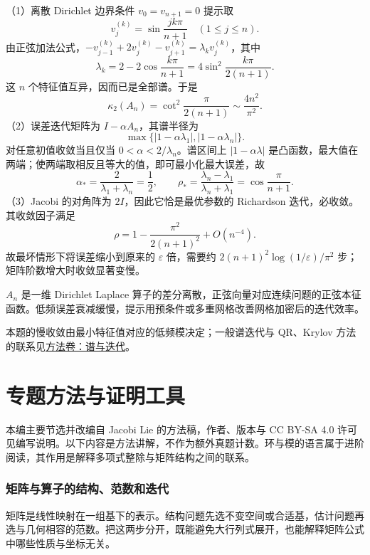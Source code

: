 \documentclass[12pt,fontset=fandol]{ctexart}
\begin{document}
\begin{solve}

（1）离散 Dirichlet 边界条件 $v_0=v_{n+1}=0$ 提示取
\[
v_j^{(k)}=\sin\frac{jk\pi}{n+1}\quad(1\le j\le n).
\]
由正弦加法公式，$-v_{j-1}^{(k)}+2v_j^{(k)}-v_{j+1}^{(k)}=\lambda_kv_j^{(k)}$，其中
\[
\lambda_k=2-2\cos\frac{k\pi}{n+1}=4\sin^2\frac{k\pi}{2(n+1)}.
\]
这 $n$ 个特征值互异，因而已是全部谱。于是
\[
\kappa_2(A_n)=\cot^2\frac\pi{2(n+1)}\sim\frac{4n^2}{\pi^2}.
\]
（2）误差迭代矩阵为 $I-\alpha A_n$，其谱半径为
\[
\max\{|1-\alpha\lambda_1|,|1-\alpha\lambda_n|\}.
\]
对任意初值收敛当且仅当 $\boxed{0<\alpha<2/\lambda_n}$。谱区间上 $|1-\alpha\lambda|$ 是凸函数，最大值在两端；使两端取相反且等大的值，即可最小化最大误差，故
\[
\boxed{\alpha_*=\frac2{\lambda_1+\lambda_n}=\frac12},\qquad
\rho_*=\frac{\lambda_n-\lambda_1}{\lambda_n+\lambda_1}=\cos\frac\pi{n+1}.
\]
（3）Jacobi 的对角阵为 $2I$，因此它恰是最优参数的 Richardson 迭代，必收敛。其收敛因子满足
\[
\rho=1-\frac{\pi^2}{2(n+1)^2}+O(n^{-4}).
\]
故最坏情形下将误差缩小到原来的 $\varepsilon$ 倍，需要约 $2(n+1)^2\log(1/\varepsilon)/\pi^2$ 步；矩阵阶数增大时收敛显著变慢。

\end{solve}

\begin{remark}[方法与条件]

$A_n$ 是一维 Dirichlet Laplace 算子的差分离散，正弦向量对应连续问题的正弦本征函数。低频误差衰减缓慢，提示用预条件或多重网格改善网格加密后的迭代效率。

本题的慢收敛由最小特征值对应的低频模决定；一般谱迭代与 QR、Krylov 方法的联系见\hyperref[app:linear-iteration]{方法卷：谱与迭代}。

\end{remark}

\part{专题方法与证明工具}

本编主要节选并改编自 Jacobi Lie 的方法稿，作者、版本与 CC BY-SA 4.0 许可见编写说明。以下内容是方法讲解，不作为额外真题计数。环与模的语言属于进阶阅读，其作用是解释多项式整除与矩阵结构之间的联系。



\section{矩阵与算子的结构、范数和迭代}

矩阵是线性映射在一组基下的表示。结构问题先选不变空间或合适基，估计问题再选与几何相容的范数。把这两步分开，既能避免大行列式展开，也能解释矩阵公式中哪些性质与坐标无关。
\end{document}
